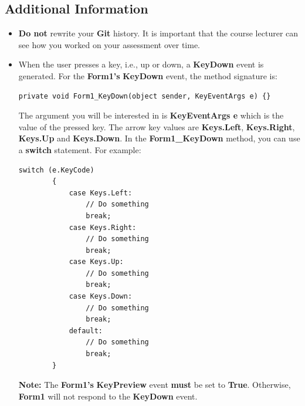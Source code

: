 \documentclass{article}
\begin{document}
\subsection*{Additional Information}
\begin{itemize}
    \item \textbf{Do not} rewrite your \textbf{Git} history. It is important that the course lecturer can see how you worked on your assessment over time.
    \item When the user presses a key, i.e., up or down, a \textbf{KeyDown} event is generated. For the \textbf{Form1's} \textbf{KeyDown} event, the method signature is:
    \begin{Verbatim}[tabsize=2]
		private void Form1_KeyDown(object sender, KeyEventArgs e) {}
	\end{Verbatim}
	The argument you will be interested in is \textbf{KeyEventArgs e} which is the value of the pressed key. The arrow key values are \textbf{Keys.Left}, \textbf{Keys.Right}, \textbf{Keys.Up} and \textbf{Keys.Down}. In the \textbf{Form1\_KeyDown} method, you can use a \textbf{switch} statement. For example:
	\begin{Verbatim}[tabsize=2]
		switch (e.KeyCode) 
		{
			case Keys.Left:
				// Do something
				break;
			case Keys.Right:
				// Do something
				break;
			case Keys.Up:
				// Do something
				break;
			case Keys.Down:
				// Do something
				break;
			default:
				// Do something
				break;
		}
	\end{Verbatim}
	\textbf{Note:} The \textbf{Form1's} \textbf{KeyPreview} event \textbf{must} be set to \textbf{True}. Otherwise, \textbf{Form1} will not respond to the \textbf{KeyDown} event.
\end{itemize}
\end{document}
